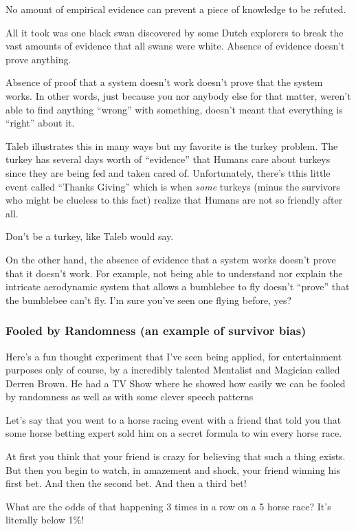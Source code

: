 \documentclass{article}
\begin{document}
No amount of empirical evidence can prevent a piece of knowledge to be refuted.

All it took was one black swan discovered by some Dutch explorers to break the vast amounts of evidence that all swans were white. Absence of evidence doesn't prove anything.

Absence of proof that a system doesn't work doesn't prove that the system works. 
In other words, just because you nor anybody else for that matter, weren't able to find anything ``wrong'' with something, doesn't meant that everything is ``right'' about it.

Taleb illustrates this in many ways but my favorite is the turkey problem. The turkey has several days worth of ``evidence'' that Humans care about turkeys since they are being fed and taken cared of. Unfortunately, there's tthis little event called ``Thanks Giving'' which is when \textit{some} turkeys (minus the survivors who might be clueless to this fact) realize that Humans are not so friendly after all. 

Don't be a turkey, like Taleb would say.

On the other hand, the absence of evidence that a system works doesn't prove that it doesn't work. For example, not being able to understand nor explain the intricate aerodynamic system that allows a bumblebee to fly doesn't ``prove'' that the bumblebee can't fly. I'm sure you've seen one flying before, yes?

\subsubsection{Fooled by Randomness (an example of survivor bias)}

Here's a fun thought experiment that I've seen being applied, for entertainment purposes only of course, by a incredibly talented Mentalist and Magician called Derren Brown. He had a TV Show where he showed how easily we can be fooled by randomness as well as with some clever speech patterns

Let's say that you went to a horse racing event with a friend that told you that some horse betting expert sold him on a secret formula to win every horse race. 

At first you think that your friend is crazy for believing that such a thing exists.
But then you begin to watch, in amazement and shock, your friend winning his first bet. And then the second bet. And then a third bet! 

What are the odds of that happening 3 times in a row on a 5 horse race? It's literally below 1\%!
\end{document}
